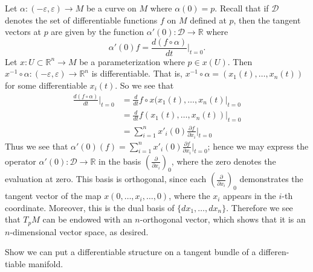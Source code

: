 \documentclass[12pt,letterpaper,boxed]{math_hw_pset}
\newcommand{\rr}{\mathbb{R}}
\renewcommand{\epsilon}{\varepsilon}
\begin{document}
\begin{solution}
    Let $\alpha: (-\epsilon, \epsilon) \to  M$ be a curve on $M$ 
    where  $\alpha(0) = p$.
    Recall that if $\mathcal{D}$ denotes the set of differentiable functions $f$ on $M$ 
    defined at $p$, then
    the tangent vectors at $p$ are given by the function  $\alpha'(0): \mathcal{D} \to \rr$ 
    where
    \[
        \alpha'(0)f = \frac{d(f\circ\alpha)}{dt}\Big|_{t=0}.
    \]
    Let $x: U \subset \rr^n \to M$ be a parameterization where $p \in x(U)$. 
    Then $x^{-1} \circ \alpha: (-\epsilon, \epsilon) \to \rr^n$ is differentiable.
    That is, $x^{-1}\circ \alpha = (x_1(t), \dots, x_n(t))$ for some differentiable $x_i(t)$.  
    So we see that 
    \begin{align*}
        \frac{d(f\circ\alpha)}{dt}\Big|_{t=0}
        &= 
        \frac{d}{dt}f \circ x(x_1(t), \dots, x_n(t)\Big|_{t=0}\\
        &= 
        \frac{d}{dt}f(x_1(t), \dots, x_n(t))\Big|_{t=0}\\
        &= 
        \sum_{i=1}^{n}x'_i(0)\frac{\partial f}{\partial x_i}\Big|_{t=0}
    \end{align*}
    Thus we see that $\displaystyle \alpha'(0)(f) = \sum_{i=1}^{n}x'_i(0)\frac{\partial f}{\partial x_i}\Big|_{t=0}$; 
    hence we may express the operator $\alpha'(0): \mathcal{D} \to \rr$ 
    in the basis $\displaystyle \left(\frac{\partial}{\partial x_i}\right)_{0}$, where the zero 
    denotes the evaluation at zero. This basis is 
    orthogonal, since each $\displaystyle \left(\frac{\partial}{\partial x_i}\right)_{0}$ 
    demonstrates the tangent vector of the map $x(0, \dots, x_i, \dots, 0)$, where the $x_i$ appears 
    in the $i$-th coordinate. Moreover, this is the dual basis of 
    $\{dx_1, \dots, dx_n\}$. Therefore we see that $T_pM$ 
    can be endowed with an $n$-orthogonal vector, which shows that it is an $n$-dimensional 
    vector  space, as desired.  
    
\end{solution}

\begin{exercise}[Problem 3.]
    Show we can put a differentiable structure on a tangent bundle of a differen-
tiable manifold. 
\end{exercise}
\end{document}
